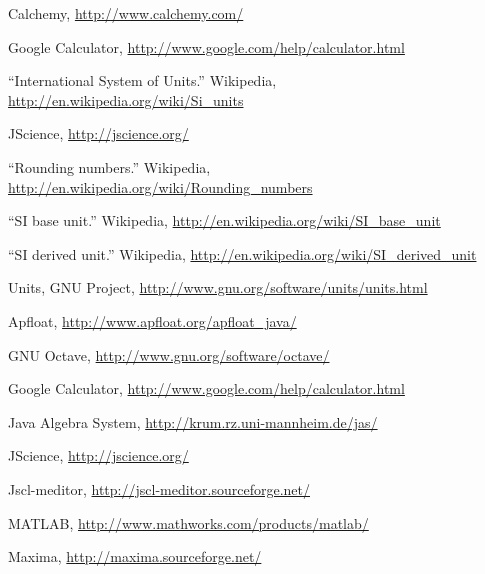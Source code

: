 \begin{thebibliography}{99}

 Calchemy, \url{http://www.calchemy.com/}

 Google Calculator,
  \url{http://www.google.com/help/calculator.html}

 ``International System of Units.''  Wikipedia,
  \url{http://en.wikipedia.org/wiki/Si_units}

 JScience,  \url{http://jscience.org/}

 ``Rounding numbers.''  Wikipedia,
  \url{http://en.wikipedia.org/wiki/Rounding_numbers}

 ``SI base unit.''  Wikipedia,
  \url{http://en.wikipedia.org/wiki/SI_base_unit}

 ``SI derived unit.''  Wikipedia,
  \url{http://en.wikipedia.org/wiki/SI_derived_unit}

 Units, GNU Project,
  \url{http://www.gnu.org/software/units/units.html}

 Apfloat, \url{http://www.apfloat.org/apfloat_java/}

 GNU Octave, \url{http://www.gnu.org/software/octave/}

 Google Calculator, \url{http://www.google.com/help/calculator.html}

 Java Algebra System, \url{http://krum.rz.uni-mannheim.de/jas/}

 JScience,  \url{http://jscience.org/}

 Jscl-meditor, \url{http://jscl-meditor.sourceforge.net/}

 MATLAB, \url{http://www.mathworks.com/products/matlab/}

 Maxima, \url{http://maxima.sourceforge.net/}

\end{thebibliography}
